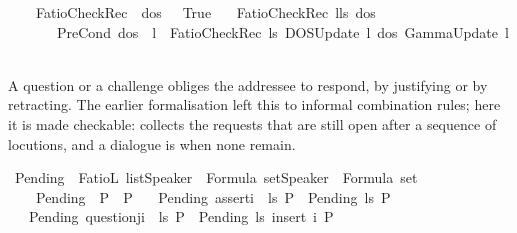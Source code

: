 \begin{isabellebody}
\ \ \ \ {\isachardoublequoteopen}FatioCheckRec\ {\isacharbrackleft}{\kern0pt}{\isacharbrackright}{\kern0pt}\ dos\ {\isasymGamma}\ {\isacharequal}{\kern0pt}\ True{\isachardoublequoteclose}\isanewline
\ \ {\isacharbar}{\kern0pt}\ {\isachardoublequoteopen}FatioCheckRec\ {\isacharparenleft}{\kern0pt}l{\isacharhash}{\kern0pt}ls{\isacharparenright}{\kern0pt}\ dos\ {\isasymGamma}\ {\isacharequal}{\kern0pt}\isanewline
\ \ \ \ \ \ \ {\isacharparenleft}{\kern0pt}PreCond\ dos\ {\isasymGamma}\ l\ {\isasymand}\ FatioCheckRec\ ls\ {\isacharparenleft}{\kern0pt}DOSUpdate\ l\ dos{\isacharparenright}{\kern0pt}\ {\isacharparenleft}{\kern0pt}GammaUpdate\ l\ {\isasymGamma}{\isacharparenright}{\kern0pt}{\isacharparenright}{\kern0pt}{\isachardoublequoteclose}%
\isadelimdocument
%
\endisadelimdocument
%
\isatagdocument
%
\isamarkuptrue%
%
\endisatagdocument
{\isafolddocument}%
%
\isadelimdocument
%
\endisadelimdocument
%
\begin{isamarkuptext}%
A question or a challenge obliges the addressee to respond, by justifying or
by retracting. The earlier formalisation left this to informal combination rules;
here it is made checkable:  collects the requests that are still open
after a sequence of locutions, and a dialogue is  when none remain.%
\end{isamarkuptext}\isamarkuptrue%
\isamarkupfalse%
\ Pending\ {\isacharcolon}{\kern0pt}{\isacharcolon}{\kern0pt}\ {\isachardoublequoteopen}FatioL\ list{\isasymRightarrow}{\isacharparenleft}{\kern0pt}Speaker\ {\isasymtimes}\ Formula{\isacharparenright}{\kern0pt}\ set{\isasymRightarrow}{\isacharparenleft}{\kern0pt}Speaker\ {\isasymtimes}\ Formula{\isacharparenright}{\kern0pt}\ set{\isachardoublequoteclose}\ \isanewline
\ \ \ \ {\isachardoublequoteopen}Pending\ {\isacharbrackleft}{\kern0pt}{\isacharbrackright}{\kern0pt}\ P\ {\isacharequal}{\kern0pt}\ P{\isachardoublequoteclose}\isanewline
\ \ {\isacharbar}{\kern0pt}\ {\isachardoublequoteopen}Pending\ {\isacharparenleft}{\kern0pt}assert{\isacharbrackleft}{\kern0pt}i{\isacharcomma}{\kern0pt}{\isasymphi}{\isacharbrackright}{\kern0pt}\ {\isacharhash}{\kern0pt}\ ls{\isacharparenright}{\kern0pt}\ P\ {\isacharequal}{\kern0pt}\ Pending\ ls\ P{\isachardoublequoteclose}\isanewline
\ \ {\isacharbar}{\kern0pt}\ {\isachardoublequoteopen}Pending\ {\isacharparenleft}{\kern0pt}question{\isacharbrackleft}{\kern0pt}j{\isacharcomma}{\kern0pt}i{\isacharcomma}{\kern0pt}{\isasymphi}{\isacharbrackright}{\kern0pt}\ {\isacharhash}{\kern0pt}\ ls{\isacharparenright}{\kern0pt}\ P\ {\isacharequal}{\kern0pt}\ Pending\ ls\ {\isacharparenleft}{\kern0pt}insert\ {\isacharparenleft}{\kern0pt}i{\isacharcomma}{\kern0pt}{\isasymphi}{\isacharparenright}{\kern0pt}\ P{\isacharparenright}{\kern0pt}{\isachardoublequoteclose}\isanewline

\end{isabellebody}
